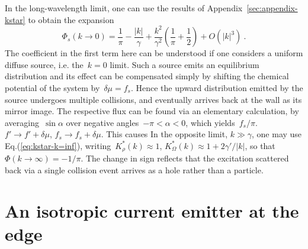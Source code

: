 \documentclass[preprint,aps,eqsecnum, prb]{revtex4-1}
\begin{document}
In the long-wavelength limit, one can  use  the results of
Appendix~\ref{sec:appendix-kstar} to obtain the expansion
\begin{equation}
  \label{eq:phi-s-low}
  \Phi_s(k\to 0) = \frac{1}{\pi} - \frac{|k|}{\gamma} + \frac{k^2}{\gamma^2}
  \left(\frac{1}{\pi} + \frac{1}{2}\right)
  + O(|k|^3)
  \ .
\end{equation}
The coefficient in the first term here can be understood if one
considers a uniform diffuse source, i.e. the~$k = 0$ limit.
Such a source emits an equilibrium distribution and its effect
can be compensated simply by shifting the chemical potential
of the system by~$\delta\mu = f_s$. Hence the upward distribution
emitted by the source undergoes multiple collisions,
and eventually arrives back at the wall as its mirror image.
The respective flux can be found via an elementary calculation,
by averaging~$\sin\alpha$ over negative angles~$-\pi < \alpha < 0$,
which yields~$f_s/\pi$.
$f' \to f' + \delta\mu$, $f_s \to f_s +  \delta\mu$. This causes
In the opposite limit, $k \gg \gamma$, one
may use Eq.(\ref{eq:kstar-k=inf}), writing~$K^\ast_\rho(k) \approx 1$,
$K_\Omega^\ast(k) \approx 1 + 2\gamma'/|k|$,
so that~$\Phi(k \to\infty) = - 1/\pi$.
The change in sign reflects that the excitation scattered back via a single
collision event arrives as a hole rather than a particle.


\section{An isotropic current emitter at the edge}
\label{sec:boundary-src}
\end{document}
